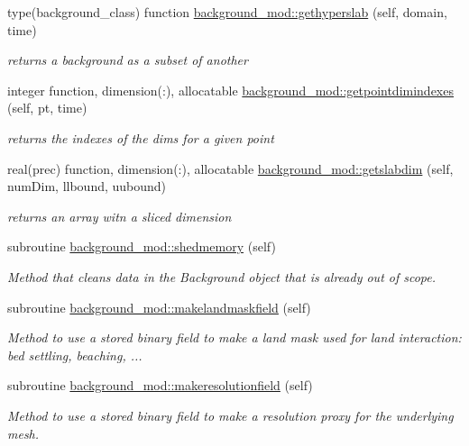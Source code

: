 \begin{DoxyCompactItemize}
type(background\+\_\+class) function \mbox{\hyperlink{namespacebackground__mod_ae26fda3baab915148ec5749d1eda2ea6}{background\+\_\+mod\+::gethyperslab}} (self, domain, time)
\begin{DoxyCompactList}\small\item\em returns a background as a subset of another \end{DoxyCompactList}\item 
integer function, dimension(\+:), allocatable \mbox{\hyperlink{namespacebackground__mod_ac799224ce7ad219bf1fb4f1f42508f45}{background\+\_\+mod\+::getpointdimindexes}} (self, pt, time)
\begin{DoxyCompactList}\small\item\em returns the indexes of the dims for a given point \end{DoxyCompactList}\item 
real(prec) function, dimension(\+:), allocatable \mbox{\hyperlink{namespacebackground__mod_a09d61976c4545e8753eb4594044b109d}{background\+\_\+mod\+::getslabdim}} (self, num\+Dim, llbound, uubound)
\begin{DoxyCompactList}\small\item\em returns an array witn a sliced dimension \end{DoxyCompactList}\item 
subroutine \mbox{\hyperlink{namespacebackground__mod_a2c75c9011305adad2f19fc2233df700d}{background\+\_\+mod\+::shedmemory}} (self)
\begin{DoxyCompactList}\small\item\em Method that cleans data in the Background object that is already out of scope. \end{DoxyCompactList}\item 
subroutine \mbox{\hyperlink{namespacebackground__mod_a26fbde130644e684871804b73de8d51b}{background\+\_\+mod\+::makelandmaskfield}} (self)
\begin{DoxyCompactList}\small\item\em Method to use a stored binary field to make a land mask used for land interaction\+: bed settling, beaching, ... \end{DoxyCompactList}\item 
subroutine \mbox{\hyperlink{namespacebackground__mod_aac8ce1ba8edcc9b7669d427318191552}{background\+\_\+mod\+::makeresolutionfield}} (self)
\begin{DoxyCompactList}\small\item\em Method to use a stored binary field to make a resolution proxy for the underlying mesh. \end{DoxyCompactList}\item 

\end{DoxyCompactItemize}
